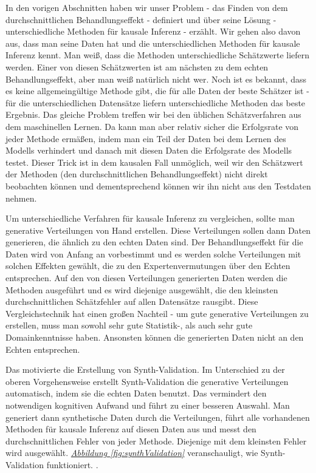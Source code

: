 \documentclass[12pt,a4paper,twoside]{scrartcl}
\numberwithin{equation}{section}
\newcommand{\reffig}[1]{\emph{\hyperref[#1]{Abbildung \ref*{#1}}}}
\begin{document}
In den vorigen Abschnitten haben wir unser Problem - das Finden von dem durchschnittlichen Behandlungseffekt - definiert und über seine Lösung - unterschiedliche Methoden für kausale Inferenz - erzählt. Wir gehen also davon aus, dass man seine Daten hat und die unterschiedlichen Methoden für kausale Inferenz kennt. Man weiß, dass die Methoden unterschiedliche Schätzwerte liefern werden. Einer von diesen Schätzwerten ist am nächsten zu dem echten Behandlungseffekt, aber man weiß natürlich nicht wer. Noch ist es bekannt, dass es keine allgemeingültige Methode gibt, die für alle Daten der beste Schätzer ist - für die unterschiedlichen Datensätze liefern unterschiedliche Methoden das beste Ergebnis. Das gleiche Problem treffen wir bei den üblichen Schätzverfahren aus dem maschinellen Lernen. Da kann man aber relativ sicher die Erfolgsrate von  jeder Methode ermäßen, indem man ein Teil der Daten bei dem Lernen des Modells verhindert und danach mit diesen Daten die Erfolgsrate des Modells testet. Dieser Trick ist in dem kausalen Fall unmöglich, weil wir den Schätzwert der Methoden (den durchschnittlichen Behandlungseffekt) nicht direkt beobachten können und dementsprechend können wir ihn nicht aus den Testdaten nehmen\cite{schuler2017synth}.\par

\noindent
Um unterschiedliche Verfahren für kausale Inferenz zu vergleichen, sollte man generative Verteilungen von Hand erstellen. Diese Verteilungen sollen dann Daten generieren, die ähnlich zu den echten Daten sind. Der Behandlungseffekt für die Daten wird von Anfang an vorbestimmt und es werden solche Verteilungen mit solchen Effekten gewählt, die zu den Expertenvermutungen über den Echten entsprechen. Auf den von diesen Verteilungen generierten Daten werden die Methoden ausgeführt und es wird diejenige ausgewählt, die den kleinsten durchschnittlichen Schätzfehler auf  allen Datensätze rausgibt. Diese Vergleichstechnik hat einen großen Nachteil - um gute generative Verteilungen zu erstellen, muss man sowohl sehr gute Statistik-, als auch sehr gute Domainkenntnisse haben. Ansonsten können die generierten Daten nicht an den Echten entsprechen\cite{schuler2017synth}.\par 

\noindent
Das motivierte die Erstellung von Synth-Validation. Im Unterschied zu der oberen Vorgehensweise erstellt Synth-Validation die generative Verteilungen automatisch, indem sie die echten Daten benutzt. Das vermindert den notwendigen kognitiven Aufwand und führt zu einer besseren Auswahl. Man generiert dann synthetische Daten durch die Verteilungen, führt alle vorhandenen Methoden für kausale Inferenz auf diesen Daten aus und messt den durchschnittlichen Fehler von jeder Methode. Diejenige mit dem kleinsten Fehler wird ausgewählt. \reffig{fig:synthValidation} veranschauligt, wie Synth-Validation funktioniert. \cite{schuler2017synth}.\par 
\end{document}
